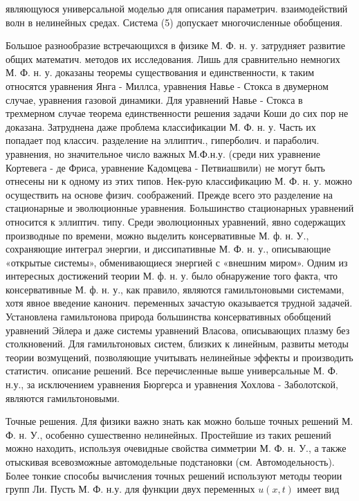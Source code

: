 \documentclass[10pt]{article}
\begin{document}
являющуюся универсальной моделью для описания параметрич. взаимодействий волн в нелинейных средах. Система (5) допускает многочисленные обобщения.



Большое разнообразие встречающихся в физике М. Ф. н. у. затрудняет развитие общих математич. методов их исследования. Лишь для сравнительно немногих М. Ф. н. у. доказаны теоремы существования и единственности, к таким относятся уравнения Янга - Миллса, уравнения Навье - Стокса в двумерном случае, уравнения газовой динамики. Для уравнений Навье - Стокса в трехмерном случае теорема единственности решения задачи Коши до сих пор не доказана. Затруднена даже проблема классификации М. Ф. н. у. Часть их попадает под классич. разделение на эллиптич., гиперболич. и параболич. уравнения, но значительное число важных М.Ф.н.у. (среди них уравнение Кортевега - де Фриса, уравнение Кадомцева - Петвиашвили) не могут быть отнесены ни к одному из этих типов. Нек-рую классификацию М. Ф. н. у. можно осуществить на основе физич. соображений. Прежде всего это разделение на стационарные и эволюционные уравнения. Большинство стационарных уравнений относится к эллиптич. типу. Среди эволюционных уравнений, явно содержащих производные по времени, можно выделить консервативные М. ф. н. У., сохраняющие интеграл энергии, и диссипативные М. Ф. н. у., описывающие «открытые системы», обменивающиеся энергией с «внешним миром». Одним из интересных достижений теории М. ф. н. у. было обнаружение того факта, что консервативные М. ф. н. у., как правило, являются гамильтоновыми системами, хотя явное введение канонич. переменных зачастую оказывается трудной задачей. Установлена гамильтонова природа большинства консервативных обобщений уравнений Эйлера и даже системы уравнений Власова, описывающих плазму без столкновений. Для гамильтоновых систем, близких к линейным, развиты методы теории возмущений, позволяющие учитывать нелинейные эффекты и производить статистич. описание решений. Все перечисленные выше универсальные М. Ф. н.у., за исключением уравнения Бюргерса и уравнения Хохлова - Заболотской, являются гамильтоновыми.



Точные решения. Для физики важно знать как можно больше точных решений М. Ф. н. У., особенно сушественно нелинейных. Простейшие из таких решений можно находить, используя очевидные свойства симметрии М. Ф. н. У., а также отыскивая всевозможные автомодельные подстановки (см. Автомодельность). Более тонкие способы вычисления точных решений используют методы теории групп Ли. Пусть М. Ф. н.у. для функции двух переменных $u(x, t)$ имеет вид
\end{document}
